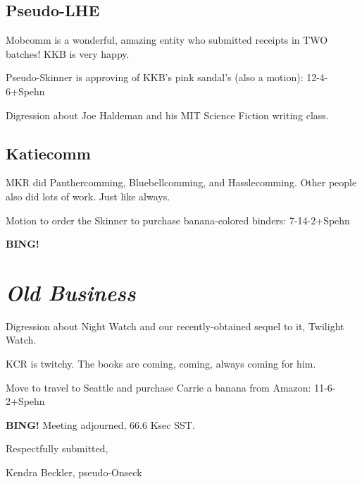 \documentclass[10pt]{article}
\newcommand{\bing}{{\bf BING!} }
\newcommand{\goto}[1]{\bing \vskip 12pt \section*{{\em{#1}}}}
\begin{document}
\subsection*{Pseudo-LHE}

Mobcomm is a wonderful, amazing entity who submitted receipts in TWO batches!  KKB is very happy.

Pseudo-Skinner is approving of KKB's pink sandal's (also a motion): 12-4-6+Spehn

Digression about Joe Haldeman and his MIT Science Fiction writing class.

\subsection*{Katiecomm}

MKR did Panthercomming, Bluebellcomming, and Hasslecomming.  Other people also did lots of work.  Just like always.

Motion to order the Skinner to purchase banana-colored binders: 7-14-2+Spehn



\goto{Old Business}

Digression about Night Watch and our recently-obtained sequel to it, Twilight Watch.

KCR is twitchy.  The books are coming, coming, always coming for him.

Move to travel to Seattle and purchase Carrie a banana from Amazon: 11-6-2+Spehn



\bing
\noindent
Meeting adjourned, 66.6 Ksec SST.

\vspace{18pt}

\centerline{Respectfully submitted,}
\centerline{Kendra Beckler, pseudo-Onseck}
\end{document}
